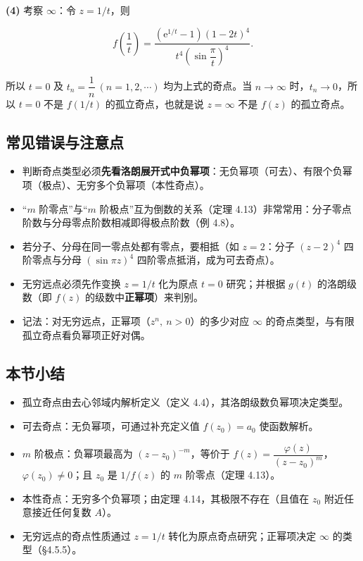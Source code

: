 \textbf{(4)} 考察 \(\infty\)：令 \(z=1/t\)，则

\[
f\left(\frac{1}{t}\right)=\frac{(\mathrm{e}^{1/t}-1)(1-2t)^4}{t^4\left(\sin\dfrac{\pi}{t}\right)^4}.
\]

所以 \(t=0\) 及 \(t_n=\dfrac{1}{n}\ (n=1,2,\cdots)\) 均为上式的奇点。当
\(n\to\infty\) 时，\(t_n\to0\)，所以 \(t=0\) 不是 \(f(1/t)\)
的孤立奇点，也就是说 \(z=\infty\) 不是 \(f(z)\) 的孤立奇点。

\subsection{常见错误与注意点}\label{ux5e38ux89c1ux9519ux8befux4e0eux6ce8ux610fux70b9-15}

\begin{itemize}
\tightlist
\item
  判断奇点类型必须\textbf{先看洛朗展开式中负幂项}：无负幂项（可去）、有限个负幂项（极点）、无穷多个负幂项（本性奇点）。
\item
  ``\(m\) 阶零点''与``\(m\) 阶极点''互为倒数的关系（定理
  4.13）非常常用：分子零点阶数与分母零点阶数相减即得极点阶数（例 4.8）。
\item
  若分子、分母在同一零点处都有零点，要相抵（如 \(z=2\)：分子 \((z-2)^4\)
  四阶零点与分母 \((\sin\pi z)^4\) 四阶零点抵消，成为可去奇点）。
\item
  无穷远点必须先作变换 \(z=1/t\) 化为原点 \(t=0\) 研究；并根据 \(g(t)\)
  的洛朗级数（即 \(f(z)\) 的级数中\textbf{正幂项}）来判别。
\item
  记法：对无穷远点，正幂项（\(z^n,\ n>0\)）的多少对应 \(\infty\)
  的奇点类型，与有限孤立奇点看负幂项正好对偶。
\end{itemize}

\subsection{本节小结}\label{ux672cux8282ux5c0fux7ed3-15}

\begin{itemize}
\tightlist
\item
  孤立奇点由去心邻域内解析定义（定义 4.4），其洛朗级数负幂项决定类型。
\item
  可去奇点：无负幂项，可通过补充定义值 \(f(z_0)=a_0\) 使函数解析。
\item
  \(m\) 阶极点：负幂项最高为 \((z-z_0)^{-m}\)，等价于
  \(f(z)=\dfrac{\varphi(z)}{(z-z_0)^m}\)，\(\varphi(z_0)\neq 0\)；且
  \(z_0\) 是 \(1/f(z)\) 的 \(m\) 阶零点（定理 4.13）。
\item
  本性奇点：无穷多个负幂项；由定理 4.14，其极限不存在（且值在 \(z_0\)
  附近任意接近任何复数 \(A\)）。
\item
  无穷远点的奇点性质通过 \(z=1/t\) 转化为原点奇点研究；正幂项决定
  \(\infty\) 的类型（§4.5.5）。
\end{itemize}

\newpage

